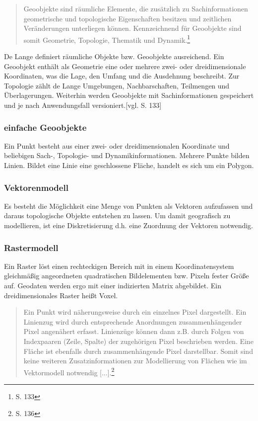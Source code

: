 \begin{quote}
Geoobjekte sind räumliche Elemente, die zusätzlich zu Sachinformationen geometrische und topologische Eigenschaften besitzen und zeitlichen Veränderungen unterliegen können. Kennzeichnend für Geoobjekte sind somit Geometrie, Topologie, Thematik und Dynamik.\footnote{\cite{book:gi-theopluspraxis3} S. 133}
\end{quote}
De Lange definiert räumliche Objekte bzw. Geoobjekte ausreichend.
Ein Geoobjekt enthält als Geometrie eine oder mehrere zwei- oder dreidimensionale Koordinaten, was die Lage, den Umfang und die Ausdehnung beschreibt.
Zur Topologie zählt de Lange Umgebungen, Nachbarschaften, Teilmengen und Überlagerungen.
Weiterhin werden Geoobjekte mit Sachinformationen gespeichert und je nach Anwendungsfall versioniert.[vgl. \cite{book:gi-theopluspraxis3} S. 133]


\subsubsection{einfache Geoobjekte}

Ein Punkt besteht aus einer zwei- oder dreidimensionalen Koordinate und beliebigen Sach-, Topologie- und Dynamikinformationen.
Mehrere Punkte bilden Linien.
Bildet eine Linie eine geschlossene Fläche, handelt es sich um ein Polygon.

\subsubsection{Vektorenmodell}

Es besteht die Möglichkeit eine Menge von Punkten als Vektoren aufzufassen und daraus topologische Objekte entstehen zu lassen.
Um damit geografisch zu modellieren, ist eine Diskretisierung d.h. eine Zuordnung der Vektoren notwendig. 

\subsubsection{Rastermodell}

Ein Raster löst einen rechteckigen Bereich mit in einem Koordinatensystem gleichmäßig angeordneten quadratischen Bildelementen bzw. Pixeln fester Größe auf.
Geodaten werden ergo mit einer indizierten Matrix abgebildet.
Ein dreidimensionales Raster heißt Voxel.
\begin{quote}
Ein Punkt wird näherungsweise durch ein einzelnes Pixel dargestellt. Ein Linienzug wird durch entsprechende Anordnungen zusammenhängender Pixel angenähert erfasst. Linienzüge können dann z.B. durch Folgen von Indexpaaren (Zeile, Spalte) der zugehörigen Pixel beschrieben werden. Eine Fläche ist ebenfalls durch zusammenhängende Pixel darstellbar. Somit sind keine weiteren Zusatzinformationen zur Modellierung von Flächen wie im Vektormodell notwendig [...].\footnote{\cite{book:gi-theopluspraxis3} S. 136}
\end{quote}



